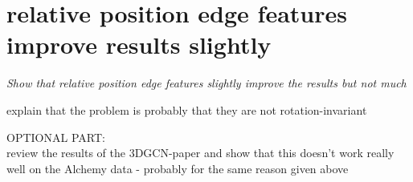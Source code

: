 \section{relative position edge features improve results slightly}

{\itshape
 Show that relative position edge features slightly improve the results but not much
 
 explain that the problem is probably that they are not rotation-invariant
	
	
OPTIONAL PART:\\
review the results of the 3DGCN-paper and show that this doesn't work really well on the Alchemy data - probably for the same reason given above
}







